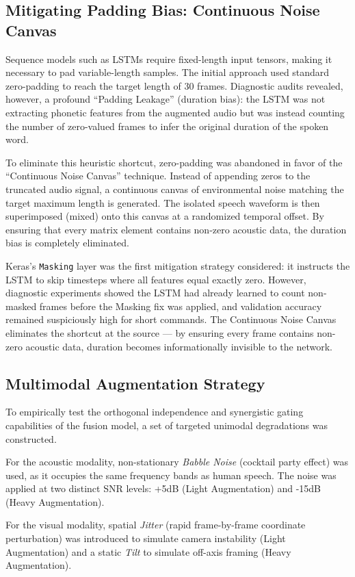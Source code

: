 \documentclass[sigconf,screen,nonacm]{acmart}
\begin{document}
\subsection{Mitigating Padding Bias: Continuous Noise Canvas}
Sequence models such as LSTMs require fixed-length input tensors, making it necessary to pad variable-length samples. The initial approach used standard zero-padding to reach the target length of 30 frames. Diagnostic audits revealed, however, a profound ``Padding Leakage'' (duration bias): the LSTM was not extracting phonetic features from the augmented audio but was instead counting the number of zero-valued frames to infer the original duration of the spoken word.

To eliminate this heuristic shortcut, zero-padding was abandoned in favor of the ``Continuous Noise Canvas'' technique. Instead of appending zeros to the truncated audio signal, a continuous canvas of environmental noise matching the target maximum length is generated. The isolated speech waveform is then superimposed (mixed) onto this canvas at a randomized temporal offset. By ensuring that every matrix element contains non-zero acoustic data, the duration bias is completely eliminated.

Keras's \texttt{Masking} layer was the first mitigation strategy considered: it instructs the LSTM to skip timesteps where all features equal exactly zero. However, diagnostic experiments showed the LSTM had already learned to count non-masked frames before the Masking fix was applied, and validation accuracy remained suspiciously high for short commands. The Continuous Noise Canvas eliminates the shortcut at the source --- by ensuring every frame contains non-zero acoustic data, duration becomes informationally invisible to the network.

\subsection{Multimodal Augmentation Strategy}
To empirically test the orthogonal independence and synergistic gating capabilities of the fusion model, a set of targeted unimodal degradations was constructed.

For the acoustic modality, non-stationary \textit{Babble Noise} (cocktail party effect) was used, as it occupies the same frequency bands as human speech. The noise was applied at two distinct SNR levels: +5dB (Light Augmentation) and -15dB (Heavy Augmentation).

For the visual modality, spatial \textit{Jitter} (rapid frame-by-frame coordinate perturbation) was introduced to simulate camera instability (Light Augmentation) and a static \textit{Tilt} to simulate off-axis framing (Heavy Augmentation).
\end{document}
